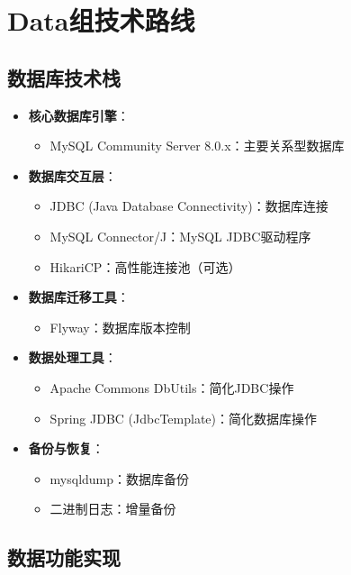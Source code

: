 \documentclass[a4paper,12pt]{article}
\begin{document}
\section{Data组技术路线}

\subsection{数据库技术栈}

\begin{itemize}
  \item \textbf{核心数据库引擎}：
    \begin{itemize}
      \item MySQL Community Server 8.0.x：主要关系型数据库
    \end{itemize}
  
  \item \textbf{数据库交互层}：
    \begin{itemize}
      \item JDBC (Java Database Connectivity)：数据库连接
      \item MySQL Connector/J：MySQL JDBC驱动程序
      \item HikariCP：高性能连接池（可选）
    \end{itemize}
  
  \item \textbf{数据库迁移工具}：
    \begin{itemize}
      \item Flyway：数据库版本控制
    \end{itemize}
  
  \item \textbf{数据处理工具}：
    \begin{itemize}
      \item Apache Commons DbUtils：简化JDBC操作
      \item Spring JDBC (JdbcTemplate)：简化数据库操作
    \end{itemize}
  
  \item \textbf{备份与恢复}：
    \begin{itemize}
      \item mysqldump：数据库备份
      \item 二进制日志：增量备份
    \end{itemize}
\end{itemize}

\subsection{数据功能实现}
\end{document}
